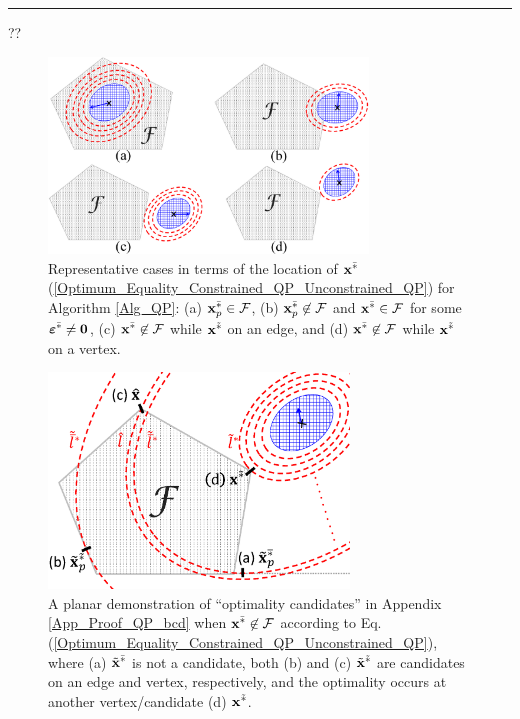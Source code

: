 \documentclass{imaman}
\newcommand{\bfx}{{\bf x}}
\newcommand{\bfvarepsilon}{{\boldsymbol \varepsilon}}
\newcommand{\bfzero}{{\bf 0}}
\newcommand{\calF}{{\mathcal F}}
\numberwithin{equation}{section}
\begin{document}
\hrule
\vspace{-0.1cm}
??
\begin{figure}[htbp]
    \begin{center}
    \includegraphics[width=8.5cm]{Fig_Locations.eps}
    \caption{Representative cases in terms of the location of $\bfx^{\bar *}$ {\rm(\ref{Optimum_Equality_Constrained_QP_Unconstrained_QP})} for Algorithm {\rm\ref{Alg_QP}}: (a) $\bfx_p^{\bar *}\in\calF$, (b) $\bfx_p^{\bar *}\not\in\calF$ and $\bfx^{\bar *}\in\calF$ for some $\bfvarepsilon^{\bar *}\ne\bfzero$, (c) $\bfx^{\bar *}\not\in\calF$ while $\bfx^{\tilde *}$ on an edge, and (d) $\bfx^{\bar *}\not\in\calF$ while $\bfx^{\tilde *}$ on a vertex.}
    \label{Fig_Locations}
    \end{center}
\end{figure}

\begin{figure}[htbp]
    \begin{center}
    \includegraphics[width=8cm]{Fig_Candidates.eps}
    \caption{A planar demonstration of ``optimality candidates'' in Appendix {\rm\ref{App_Proof_QP_bcd}} when $\bfx^{\bar *}\not\in\calF$ according to Eq. {\rm(\ref{Optimum_Equality_Constrained_QP_Unconstrained_QP})}, where (a) $\tilde\bfx^{\bar *}$ is not a candidate, both (b) and (c) $\tilde\bfx^{\tilde *}$ are candidates on an edge and vertex, respectively, and the optimality occurs at another vertex/candidate (d) $\bfx^{\tilde *}$.}
    \label{Fig_Candidates}
    \end{center}
\end{figure}
\end{document}

